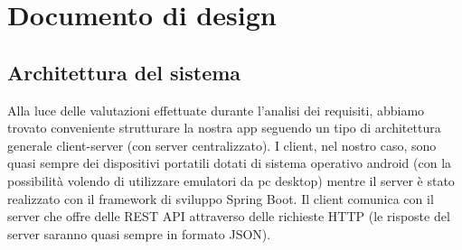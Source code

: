 \section{Documento di design}
    \subsection{Architettura del sistema}

    \begin{flushleft}
        Alla luce delle valutazioni effettuate durante l'analisi dei requisiti, abbiamo trovato conveniente strutturare la nostra app seguendo un tipo di 
        architettura generale client-server (con server centralizzato). I client, nel nostro caso, sono quasi sempre dei dispositivi portatili dotati di sistema operativo android (con la possibilità volendo di utilizzare emulatori da pc desktop)
        mentre il server è stato realizzato con il framework di sviluppo Spring Boot. Il client comunica con il server che offre delle REST API attraverso delle richieste HTTP (le risposte del server saranno quasi sempre in formato JSON). 

    \end{flushleft}

